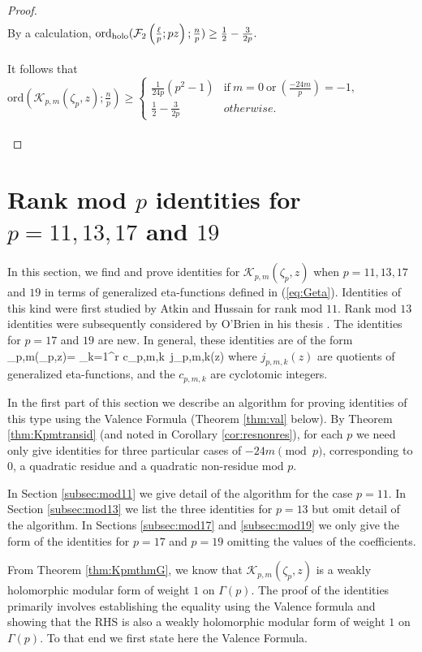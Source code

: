 \documentclass[12pt]{amsart}
\theoremstyle{definition}
\theoremstyle{remark}
\numberwithin{equation}{section}
\newcommand\leg[2]{\genfrac{(}{)}{}{}{#1}{#2}} %
\newcommand\Fell[4]{\mathcal{F}_{#1}\left(\frac{#2}{#3};#4\right)}
\newcommand\ord{\mbox{ord}}
\newcommand\hord{\mbox{ord}_{\mbox{\scriptsize holo}}}
\newcommand\thm[1]{\ref{thm:#1}}
\newcommand\corol[1]{\ref{cor:#1}}
\newcommand\eqn[1]{(\ref{eq:#1})}
\newcommand\subsect[1]{\ref{subsec:#1}}
\begin{document}
\begin{proof}
\begin{align*}
\end{align*}
By a calculation, $\hord(\Fell{2}{\ell}{p}{p z};\frac{n}{p}) \geq \frac{1}{2}-\frac{3}{2p}.$
\\\\
It follows that $\ord(\mathcal{K}_{p,m}(\zeta_p,z);\frac{n}{p}) \geq \begin{cases}
      \frac{1}{24p}(p^2-1) & \text{if}~m=0~\text{or}~\leg{-24m}{p}=-1  , \\
      \frac{1}{2}-\frac{3}{2p} & otherwise.      
    \end{cases}
$\\\\
\end{proof}



\section{Rank mod $p$ identities for $p=11, 13, 17$ and $19$}

In this section, we find and prove identities for  
$\mathcal{K}_{p,m}(\zeta_{p},z)$ when $p=11, 13, 17$ and  $19$ in terms 
of generalized eta-functions defined in \eqn{Geta}. Identities of this 
kind were first studied by Atkin and Hussain \cite{At-Hu} for rank mod $11$. 
Rank mod $13$ identities were subsequently considered by O'Brien in his 
thesis \cite{OB-thesis}. The identities for $p=17$ and $19$ are new.
In general, these identities are of the form 
\beq
{}_{p,m}(\zeta_{p},z)= \sum\limits_{k=1}^r c_{p,m,k}\, j_{p,m,k}(z)
\label{eq:Kpmid2}
\eeq
 where $j_{p,m,k}(z)$ are quotients of generalized 
eta-functions, and the $c_{p,m,k}$ are cyclotomic integers.     

In the first part of this section we describe an algorithm for proving
identities of this type using the Valence Formula (Theorem \thm{val} below).
By Theorem \thm{Kpmtransid} (and noted in Corollary \corol{resnonres}),
for each $p$ we need only give identities for three particular cases of 
$-24m\pmod{p}$, corresponding to $0$, a quadratic residue and a 
quadratic non-residue mod $p$.

In Section \subsect{mod11} we give detail of the algorithm for the
case $p=11$. In Section \subsect{mod13} we list the three identities
for $p=13$ but omit detail of the algorithm. In Sections \subsect{mod17}
and \subsect{mod19} we only give the form of the identities for $p=17$ and
$p=19$ omitting the values of the coefficients.


From 
Theorem \thm{KpmthmG}, we know that $\mathcal{K}_{p,m}(\zeta_{p},z)$ is 
a weakly holomorphic modular form of weight $1$ on $\Gamma(p)$.  The proof 
of the identities primarily involves establishing the equality using the 
Valence formula and showing that the RHS is also a weakly holomorphic 
modular form of weight $1$ on $\Gamma(p)$.  To that end we first state 
here the Valence Formula.
 
\end{document}
